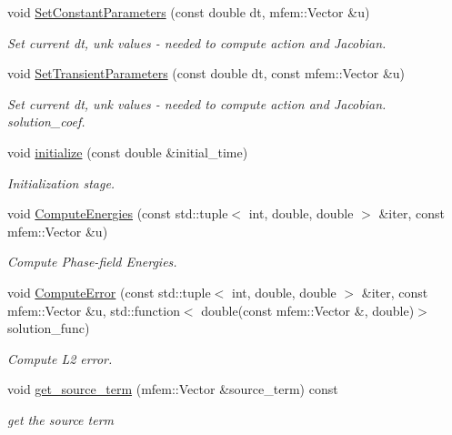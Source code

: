 \begin{DoxyCompactItemize}
void \hyperlink{classPhaseFieldOperatorBase_ae28add1cf3731d10726a9665862a725b}{Set\+Constant\+Parameters} (const double dt, mfem\+::\+Vector \&u)
\begin{DoxyCompactList}\small\item\em Set current dt, unk values -\/ needed to compute action and Jacobian. \end{DoxyCompactList}\item 
void \hyperlink{classPhaseFieldOperatorBase_a07fb8bcd8791bb712681379c160c1ad6}{Set\+Transient\+Parameters} (const double dt, const mfem\+::\+Vector \&u)
\begin{DoxyCompactList}\small\item\em Set current dt, unk values -\/ needed to compute action and Jacobian. solution\+\_\+coef. \end{DoxyCompactList}\item 
void \hyperlink{classPhaseFieldOperatorBase_a4a85f7d2ece328d8fdb8895a2b76bd0a}{initialize} (const double \&initial\+\_\+time)
\begin{DoxyCompactList}\small\item\em Initialization stage. \end{DoxyCompactList}\item 
void \hyperlink{classPhaseFieldOperatorBase_ac313363a74691d6b500191ff475b57fb}{Compute\+Energies} (const std\+::tuple$<$ int, double, double $>$ \&iter, const mfem\+::\+Vector \&u)
\begin{DoxyCompactList}\small\item\em Compute Phase-\/field Energies. \end{DoxyCompactList}\item 
void \hyperlink{classPhaseFieldOperatorBase_ae2166b96b4d740e05c5dd1ca36e9fc8c}{Compute\+Error} (const std\+::tuple$<$ int, double, double $>$ \&iter, const mfem\+::\+Vector \&u, std\+::function$<$ double(const mfem\+::\+Vector \&, double)$>$ solution\+\_\+func)
\begin{DoxyCompactList}\small\item\em Compute L2 error. \end{DoxyCompactList}\item 
void \hyperlink{classPhaseFieldOperatorBase_ade4aaf43e627fdc8b2a3690839e225d3}{get\+\_\+source\+\_\+term} (mfem\+::\+Vector \&source\+\_\+term) const
\begin{DoxyCompactList}\small\item\em get the source term \end{DoxyCompactList}\item 

\end{DoxyCompactItemize}

